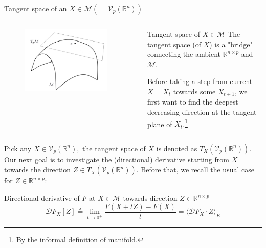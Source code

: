 \documentclass[aspectratio=43, 10pt]{beamer}
\begin{document}
  \begin{frame}[t]{Tangent space of an $X\in \mathcal{M}(=\mathcal{V}_p(\mathbb{R}^n))$}
    \vspace{-0.8em}
     \begin{columns}
            \begin{column}{0.45\textwidth}
                \begin{figure}
                    \includegraphics[width=0.9\textwidth]{figures/retraction.pdf}
                \end{figure}
            \end{column}

            \begin{column}{0.5\textwidth}
               \begin{block}{Tangent space of $X \in \mathcal{M}$}
                    The tangent space (of $X$) is a "bridge" connecting the ambient $\mathbb{R}^{n \times p}$ and $\mathcal{M}$.
                    
                    Before taking a step from current $X=X_t$ towards some $X_{t+1}$, we first want to find the deepest decreasing direction at the tangent plane of $X_t$.\footnote{By the informal definition of manifold.} 

               \end{block}
            \end{column}
        \end{columns}

    \pause 
    \vspace{0.9em}
    Pick any $X \in \mathcal{V}_p(\mathbb{R}^n),$ the tangent space of $X$ is denoted as $T_X (\mathcal{V}_p(\mathbb{R}^n))$. Our next goal is to investigate the (directional) derivative starting from $X$ towards the direction $Z \in T_X (\mathcal{V}_p(\mathbb{R}^n))$. Before that, we recall the usual case for $Z \in \mathbb{R}^{n \times p}$: 
    \begin{block}{Directional derivative of $F$ at $X\in \mathcal{M}$ towards direction $Z \in \mathbb{R}^{n \times p}$}
        $$\mathcal{D}F_X[Z] \triangleq \lim_{t \to 0^+}\frac{F(X+tZ) - F(X)}{t} = \langle \mathcal{D}F_X \cdot Z \rangle_E$$
    \end{block}
  \end{frame}
\end{document}
